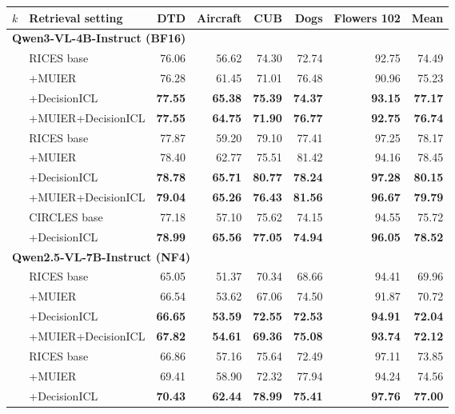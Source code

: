 \begin{tabular}{llrrrrrr}
\toprule
$k$ & Retrieval setting & DTD & Aircraft & CUB & Dogs & Flowers 102 & Mean \\
\midrule
\multicolumn{8}{l}{\textbf{Qwen3-VL-4B-Instruct (BF16)}} \\
\addlinespace[2pt]
1 & RICES base & 76.06 & 56.62 & 74.30 & 72.74 & 92.75 & 74.49 \\
 & +MUIER & 76.28 & 61.45 & 71.01 & 76.48 & 90.96 & 75.23 \\
 & +DecisionICL & \textbf{77.55} & \textbf{65.38} & \textbf{75.39} & \textbf{74.37} & \textbf{93.15} & \textbf{77.17} \\
 & +MUIER+DecisionICL & \textbf{77.55} & \textbf{64.75} & \textbf{71.90} & \textbf{76.77} & \textbf{92.75} & \textbf{76.74} \\
\addlinespace[3pt]
2 & RICES base & 77.87 & 59.20 & 79.10 & 77.41 & 97.25 & 78.17 \\
 & +MUIER & 78.40 & 62.77 & 75.51 & 81.42 & 94.16 & 78.45 \\
 & +DecisionICL & \textbf{78.78} & \textbf{65.71} & \textbf{80.77} & \textbf{78.24} & \textbf{97.28} & \textbf{80.15} \\
 & +MUIER+DecisionICL & \textbf{79.04} & \textbf{65.26} & \textbf{76.43} & \textbf{81.56} & \textbf{96.67} & \textbf{79.79} \\
\addlinespace[3pt]
2 & CIRCLES base & 77.18 & 57.10 & 75.62 & 74.15 & 94.55 & 75.72 \\
 & +DecisionICL & \textbf{78.99} & \textbf{65.56} & \textbf{77.05} & \textbf{74.94} & \textbf{96.05} & \textbf{78.52} \\
\midrule
\multicolumn{8}{l}{\textbf{Qwen2.5-VL-7B-Instruct (NF4)}} \\
\addlinespace[2pt]
1 & RICES base & 65.05 & 51.37 & 70.34 & 68.66 & 94.41 & 69.96 \\
 & +MUIER & 66.54 & 53.62 & 67.06 & 74.50 & 91.87 & 70.72 \\
 & +DecisionICL & \textbf{66.65} & \textbf{53.59} & \textbf{72.55} & \textbf{72.53} & \textbf{94.91} & \textbf{72.04} \\
 & +MUIER+DecisionICL & \textbf{67.82} & \textbf{54.61} & \textbf{69.36} & \textbf{75.08} & \textbf{93.74} & \textbf{72.12} \\
\addlinespace[3pt]
2 & RICES base & 66.86 & 57.16 & 75.64 & 72.49 & 97.11 & 73.85 \\
 & +MUIER & 69.41 & 58.90 & 72.32 & 77.94 & 94.24 & 74.56 \\
 & +DecisionICL & \textbf{70.43} & \textbf{62.44} & \textbf{78.99} & \textbf{75.41} & \textbf{97.76} & \textbf{77.00} \\

\end{tabular}
